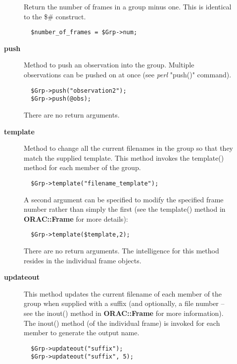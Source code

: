 \begin{description}
\begin{description}
Return the number of frames in a group minus one.
This is identical to the \$\# construct.

\begin{verbatim}
  $number_of_frames = $Grp->num;
\end{verbatim}

\item[{\textbf{push}}] \mbox{}

Method to push an observation into the group. Multiple observations
can be pushed on at once (see \emph{perl} "push()" command).

\begin{verbatim}
  $Grp->push("observation2");
  $Grp->push(@obs);
\end{verbatim}


There are no return arguments.


\item[{\textbf{template}}] \mbox{}

Method to change all the current filenames in the group so that they
match the supplied template. This method invokes the template()
method for each member of the group.

\begin{verbatim}
  $Grp->template("filename_template");
\end{verbatim}


A second argument can be specified to modify the specified frame
number rather than simply the first (see the template() method
in \textbf{ORAC::Frame} for more details):

\begin{verbatim}
  $Grp->template($template,2);
\end{verbatim}


There are no return arguments. The intelligence for this method resides
in the individual frame objects.


\item[{\textbf{updateout}}] \mbox{}

This method updates the current filename of each member of the group
when supplied with a suffix (and optionally, a file number -- see the
inout() method in \textbf{ORAC::Frame} for more information). The inout()
method (of the individual frame) is invoked for each member to
generate the output name.

\begin{verbatim}
  $Grp->updateout("suffix");
  $Grp->updateout("suffix", 5);
\end{verbatim}



\end{description}
\end{description}
